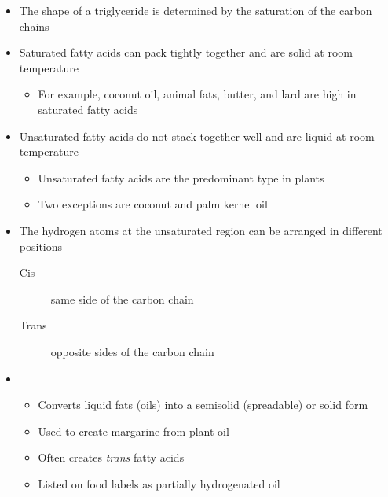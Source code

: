 \documentclass[title={Chapter 5}]{fdsn201notes}
\begin{document}
\begin{itemize}
	\item The shape of a triglyceride is determined by the saturation of the carbon chains
	\item Saturated fatty acids can pack tightly together and are solid at room temperature
	\begin{itemize}
		\item For example, coconut oil, animal fats, butter, and lard are high in saturated fatty acids
	\end{itemize}
	\item Unsaturated fatty acids do not stack together well and are liquid at room temperature
	\begin{itemize}
		\item Unsaturated fatty acids are the predominant type in plants
		\item Two exceptions are coconut and palm kernel oil
	\end{itemize}
	\item The hydrogen atoms at the unsaturated region can be arranged in different positions
	\begin{description}
		\item[Cis] same side of the carbon chain
		\item[Trans] opposite sides of the carbon chain
	\end{description}
\end{itemize}

\begin{itemize}
	\item {}
	\begin{itemize}
		\item Converts liquid fats (oils) into a semisolid (spreadable) or solid form
		\item Used to create margarine from plant oil
		\item Often creates \emph{trans} fatty acids
		\item Listed on food labels as partially hydrogenated oil
	\end{itemize}
\end{itemize}
\end{document}
